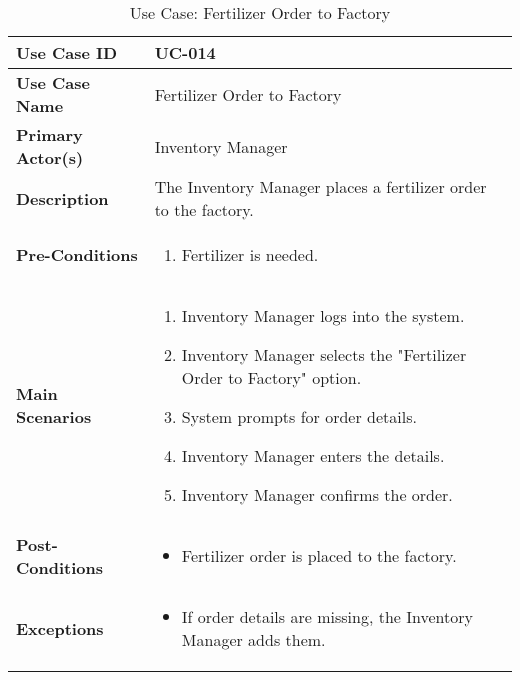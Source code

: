 \documentclass{article}
\begin{document}
\begin{table}[!ht]
    \centering
    \renewcommand{\arraystretch}{1.3}
    \begin{tabularx}{\textwidth}{|l|X|}
        \hline
        \textbf{Use Case ID} & UC-014 \\
        \hline
        \textbf{Use Case Name} & Fertilizer Order to Factory \\
        \hline
        \textbf{Primary Actor(s)} & Inventory Manager \\
        \hline
        \textbf{Description} & The Inventory Manager places a fertilizer order to the factory. \\
        \hline
        \textbf{Pre-Conditions} & 
        \begin{enumerate}[label=\arabic*.,itemsep=0pt]
            \item Fertilizer is needed.
        \end{enumerate} \\
        \hline
        \textbf{Main Scenarios} & 
        \begin{enumerate}[label=\arabic*.,itemsep=0pt]
            \item Inventory Manager logs into the system.
            \item Inventory Manager selects the "Fertilizer Order to Factory" option.
            \item System prompts for order details.
            \item Inventory Manager enters the details.
            \item Inventory Manager confirms the order.
        \end{enumerate} \\
        \hline
        \textbf{Post-Conditions} & 
        \begin{itemize}[label=--,itemsep=0pt]
            \item Fertilizer order is placed to the factory.
        \end{itemize} \\
        \hline
        \textbf{Exceptions} & 
        \begin{itemize}[label=--,itemsep=0pt]
            \item If order details are missing, the Inventory Manager adds them.
        \end{itemize} \\
        \hline
    \end{tabularx}
    \caption{Use Case: Fertilizer Order to Factory}
    \label{tab:use-case-fertilizer-order-to-factory}
\end{table}
\end{document}
